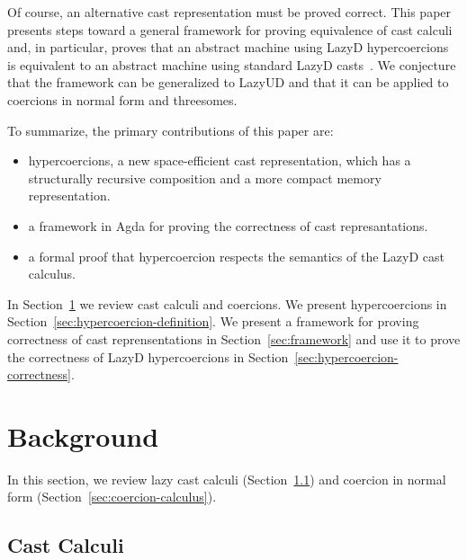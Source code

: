 \documentclass[acmsmall,review,anonymous]{acmart}\settopmatter{printfolios=true,printccs=false,printacmref=false}
\newcommand{\lazyUD}{Lazy\;UD}
\newcommand{\lazyD}{Lazy\;D}
\begin{document}
Of course, an alternative cast representation must be proved
correct. This paper presents steps toward a general framework for
proving equivalence of cast calculi and, in particular, proves that an
abstract machine using \lazyD{} hypercoercions is equivalent to an
abstract machine using standard \lazyD{}
casts~\citep{siek2009exploring}. We conjecture that the framework can
be generalized to \lazyUD{} and that it can be applied to coercions in
normal form and threesomes.

To summarize, the primary contributions of this paper are:
\begin{itemize}
\item hypercoercions, a new space-efficient cast representation, which
  has a structurally recursive composition and a more compact memory
  representation.
\item a framework in Agda for proving the correctness of cast
  represantations.
\item a formal proof that hypercoercion respects the semantics
  of the \lazyD{} cast calculus.
\end{itemize}

In Section~\ref{sec:background} we review cast calculi and coercions.
We present hypercoercions in
Section~\ref{sec:hypercoercion-definition}.  We present a framework
for proving correctness of cast reprensentations in
Section~\ref{sec:framework} and use it to prove the correctness of
\lazyD{} hypercoercions in
Section~\ref{sec:hypercoercion-correctness}.

\section{Background} \label{sec:background}

In this section, we review lazy cast calculi
(Section~\ref{sec:cast-calculi}) and coercion in normal form
(Section~\ref{sec:coercion-calculus}).

\subsection{Cast Calculi}
\label{sec:cast-calculi}
\end{document}
